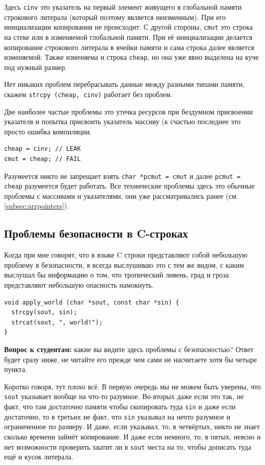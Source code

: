 \documentclass[a4paper,12pt,oneside]{book}
\begin{document}
Здесь \lstinline!cinv! это указатель на первый элемент живущего в глобальной памяти строкового литерала (который поэтому является неизменным). При его инициализации копирования не происходит. С другой стороны, \lstinline!cmut! это строка на стеке или в изменяемой глобальной памяти. При её инициализации делается копирование строкового литерала в ячейки памяти и сама строка далее является изменяемой. Также изменяема и строка \lstinline!cheap!, но она уже явно выделена на куче под нужный размер.

Нет никаких проблем перебрасывать данные между разными типами памяти, скажем \lstinline!strcpy (cheap, cinv)! работает без проблем.

Две наиболее частые проблемы это утечка ресурсов при бездумном присвоении указателя и попытка присвоить указатель массиву (к счастью последнее это просто ошибка компиляции.

\begin{lstlisting}
cheap = cinv; // LEAK
cmut = cheap; // FAIL
\end{lstlisting}

Разумеется никто не запрещает взять \lstinline!char *pcmut = cmut! и далее \lstinline!pcmut = cheap! разумеется будет работать. Все технические проблемы здесь это обычные проблемы с массивами и указателями, они уже рассматривались ранее (см. \ref{subsec:arrpointers}).

\subsection{Проблемы безопасности в C-строках}\label{subsub:secproblems}

Когда при мне говорят, что в языке C строки представляют собой небольшую проблему в безопасности, я всегда выслушиваю это с тем же видом, с каким выслушал бы информацию о том, что тропический ливень, град и гроза представляют небольшую опасность намокнуть.

\begin{lstlisting}
void apply_world (char *sout, const char *sin) {
  strcpy(sout, sin);
  strcat(sout, ", world!");  
}
\end{lstlisting}

\textbf{Вопрос к студентам:} какие вы видите здесь проблемы с безопасностью? Ответ будет сразу ниже, не читайте его прежде чем сами не насчитаете хотя бы четыре пункта.

Коротко говоря, тут плохо всё. В первую очередь мы не можем быть уверены, что \lstinline!sout! указывает вообще на что-то разумное. Во-вторых даже если это так, не факт, что там достаточно памяти чтобы скопировать туда \lstinline!sin! и даже если достаточно, то в третьих не факт, что \lstinline!sin! указывал на нечто разумное и ограниченное по размеру. И даже, если указывал, то, в четвёртых, никто не знает сколько времени займёт копирование. И даже если немного, то, в пятых, неясно и нет возможности проверить хватит ли в \lstinline!sout! места на то, чтобы дописать туда ещё и кусок литерала.
\end{document}
